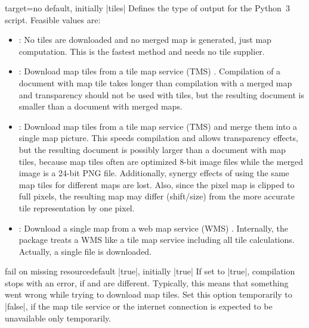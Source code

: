 \begin{docMrcKey}[supply]{target}{=}{no default, initially |tiles|}
  Defines the type of output for the Python~3 script. Feasible values are:
  \begin{itemize}
  \item{}: No tiles are downloaded and no merged map is generated, just map computation.
    This is the fastest method and needs no tile supplier.
  \item{}: Download map tiles from a tile map service (TMS) .
    Compilation of a document with map tile takes longer than compilation
    with a merged map and transparency should not be used with tiles,
    but the resulting document is smaller than a document with merged maps.
  \item{}: Download map tiles from a tile map service (TMS)
     and merge them into a single map picture.
    This speeds compilation and allows transparency effects, but
    the resulting document is possibly larger than a document with map tiles,
    because map tiles often are optimized 8-bit image files while the merged
    image is a 24-bit PNG file. Additionally, synergy effects of using the same map tiles
    for different maps are lost.
    Also, since the pixel map is clipped to full pixels, the resulting map
    may differ (shift/size) from the more accurate tile representation by
    one pixel.
  \item{}: Download a single map from a web map service (WMS)
    . Internally, the package treats a WMS like
    a tile map service including all tile calculations. Actually, a single
    file is downloaded.
  \end{itemize}
\end{docMrcKey}

\enlargethispage*{1cm}

\begin{docMrcKey}[][doc new=2020-08-06]{fail on missing resource}{}{default |true|, initially |true|}
  If set to |true|, compilation stops with an error, if
   and  are different.
  Typically, this means that something went wrong while trying to download
  map tiles. Set this option temporarily to |false|,
  if the map tile service or the internet
  connection is expected to be unavailable only temporarily.
\end{docMrcKey}



